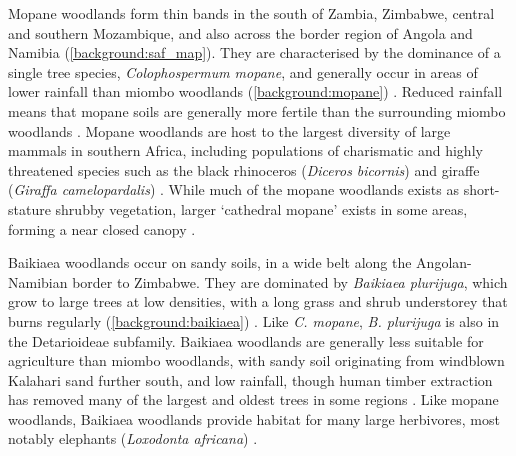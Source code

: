\begin{refsection}
Mopane woodlands form thin bands in the south of Zambia, Zimbabwe, central and southern Mozambique, and also across the border region of Angola and Namibia (\autoref{background:saf_map}). They are characterised by the dominance of a single tree species, \textit{Colophospermum mopane}, and generally occur in areas of lower rainfall than miombo woodlands (\autoref{background:mopane}) \citep{Palgrave2003}. Reduced rainfall means that mopane soils are generally more fertile than the surrounding miombo woodlands \citep{Makhado2014}. Mopane woodlands are host to the largest diversity of large mammals in southern Africa, including populations of charismatic and highly threatened species such as the black rhinoceros (\textit{Diceros bicornis}) and giraffe (\textit{Giraffa camelopardalis}) \citep{Mittermeier2003}. While much of the mopane woodlands exists as short-stature shrubby vegetation, larger `cathedral mopane' exists in some areas, forming a near closed canopy \citep{Makhado2014}.

Baikiaea woodlands occur on sandy soils, in a wide belt along the Angolan-Namibian border to Zimbabwe. They are dominated by \textit{Baikiaea plurijuga}, which grow to large trees at low densities, with a long grass and shrub understorey that burns regularly (\autoref{background:baikiaea}) \citep{Werger1978}. Like \textit{C. mopane}, \textit{B. plurijuga} is also in the Detarioideae subfamily. Baikiaea woodlands are generally less suitable for agriculture than miombo woodlands, with sandy soil originating from windblown Kalahari sand further south, and low rainfall, though human timber extraction has removed many of the largest and oldest trees in some regions \citep{Gambiza2005}. Like mopane woodlands, Baikiaea woodlands provide habitat for many large herbivores, most notably elephants (\textit{Loxodonta africana}) \citep{Holdo2007}.


\end{refsection}
